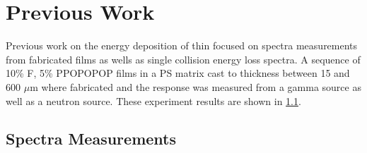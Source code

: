 
\section{Previous Work}
\label{sec:PreviousWork}
Previous work on the energy deposition of thin focused on spectra measurements from fabricated films as wells as single collision energy loss spectra.
A sequence of 10\% F, 5\% PPOPOPOP films in a PS matrix cast to thickness between 15 and 600 $\mu$m where fabricated and the response was measured from a gamma source as well as a neutron source.
These experiment results are shown in \ref{sec:SpectraMeasurements}.

\subsection{Spectra Measurements}
\label{sec:SpectraMeasurements}


